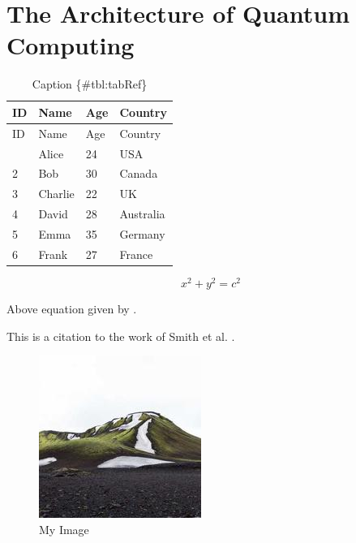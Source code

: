 \documentclass[
  12pt,
  a4paper,
  ]{report}
\begin{document}
\lipsum[0-5]

\chapter{The Architecture of Quantum
Computing}\label{the-architecture-of-quantum-computing}

\begin{center}
\label{GraphRef}
\end{center}

\begin{longtable}[]{@{}llll@{}}
\caption{Caption \{\#tbl:tabRef\}}\tabularnewline
\toprule\noalign{}
ID & Name & Age & Country \\
\midrule\noalign{}
\endfirsthead
\toprule\noalign{}
ID & Name & Age & Country \\
\midrule\noalign{}
\endhead
\bottomrule\noalign{}
\endlastfoot
1 & Alice & 24 & USA \\
2 & Bob & 30 & Canada \\
3 & Charlie & 22 & UK \\
4 & David & 28 & Australia \\
5 & Emma & 35 & Germany \\
6 & Frank & 27 & France \\
\end{longtable}

\[ x^2 + y^2 = c^2 \]

Above equation given by \autocite{Einstein1905}.

This is a citation to the work of Smith et al. \autocite{smith2021}.

\begin{figure}
\centering
\includegraphics{./resources/img.jpg}
\caption{My Image}\label{fig:imgRef}
\end{figure}
\printbibliography
\end{document}
